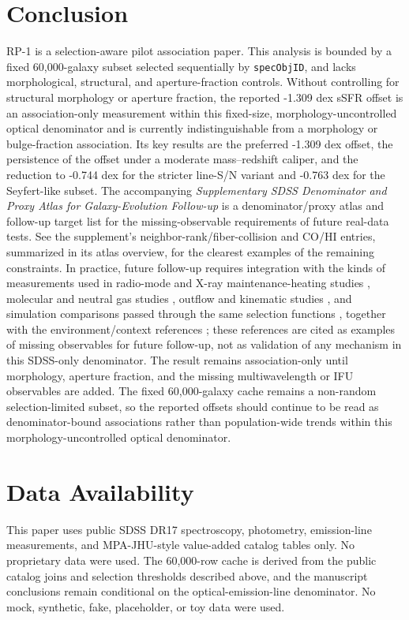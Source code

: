 \documentclass[twocolumn]{aastex631}
\begin{document}
\section{Conclusion}
RP-1 is a selection-aware pilot association paper. This analysis is bounded by a fixed 60,000-galaxy subset selected sequentially by \texttt{specObjID}, and lacks morphological, structural, and aperture-fraction controls. Without controlling for structural morphology or aperture fraction, the reported -1.309 dex sSFR offset is an association-only measurement within this fixed-size, morphology-uncontrolled optical denominator and is currently indistinguishable from a morphology or bulge-fraction association. Its key results are the preferred -1.309 dex offset, the persistence of the offset under a moderate mass--redshift caliper, and the reduction to -0.744 dex for the stricter line-S/N variant and -0.763 dex for the Seyfert-like subset. The accompanying \emph{Supplementary SDSS Denominator and Proxy Atlas for Galaxy-Evolution Follow-up} is a denominator/proxy atlas and follow-up target list for the missing-observable requirements of future real-data tests. See the supplement's neighbor-rank/fiber-collision and CO/HI entries, summarized in its atlas overview, for the clearest examples of the remaining constraints.
In practice, future follow-up requires integration with the kinds of measurements used in radio-mode and X-ray maintenance-heating studies \citep{best2005,fabian2012,mcnamara2007,heckmanbest2014,lamassa2013}, molecular and neutral gas studies \citep{xcoldgass2017,xgass2018}, outflow and kinematic studies \citep{veilleux2005,cicone2014,carniani2017,fiore2017}, and simulation comparisons passed through the same selection functions \citep{simba2019,tng2019,eagle2015}, together with the environment/context references \citep{peng2010,ellison2011,piotrowska2022,wetzel2013,dekel2006}; these references are cited as examples of missing observables for future follow-up, not as validation of any mechanism in this SDSS-only denominator. The result remains association-only until morphology, aperture fraction, and the missing multiwavelength or IFU observables are added. The fixed 60,000-galaxy cache remains a non-random selection-limited subset, so the reported offsets should continue to be read as denominator-bound associations rather than population-wide trends within this morphology-uncontrolled optical denominator.

\section*{Data Availability}
This paper uses public SDSS DR17 spectroscopy, photometry, emission-line measurements, and MPA-JHU-style value-added catalog tables only. No proprietary data were used. The 60,000-row cache is derived from the public catalog joins and selection thresholds described above, and the manuscript conclusions remain conditional on the optical-emission-line denominator. No mock, synthetic, fake, placeholder, or toy data were used.
\end{document}
